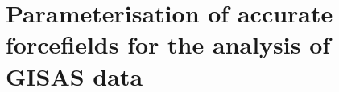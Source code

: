 
\chapter{Parameterisation of accurate forcefields for the analysis of GISAS data} %

\label{gisas} %



\pagebreak
%
%
%
%

%
%
